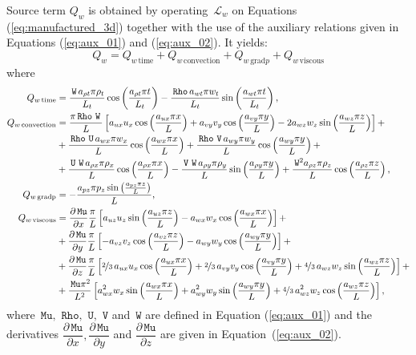\documentclass[10pt]{article}
\newcommand{\diff}[2] {\dfrac{\partial #1}{\partial #2}}
\newcommand{\Rho}{\,\mathtt{Rho}}
\newcommand{\U}{\,\mathtt{U}}
\newcommand{\V}{\,\mathtt{V}}
\newcommand{\W}{\,\mathtt{W}}
\newcommand{\Lo}{\,\mathcal{L}}
\newcommand{\Mu}{\,\mathtt{Mu}}
\newcommand{\DMuDx}{\diff{\Mu}{x}}
\newcommand{\DMuDy}{\diff{\Mu}{y}}
\newcommand{\DMuDz}{\diff{\Mu}{z}}
\newcommand{\convection}{\text{convection}}
\newcommand{\gradp}{\text{grad}p}
\newcommand{\viscous}{\text{viscous}}
\begin{document}
Source term $Q_w $ is obtained by operating $\Lo_{w }$ on Equations  (\ref{eq:manufactured_3d}) together with the use of the  auxiliary relations given in Equations (\ref{eq:aux_01}) and (\ref{eq:aux_02}). It yields:
\begin{equation*}
Q_w  = Q_{w  \, \text{time}}+Q_{w  \, \convection}+Q_{w  \, \gradp }+Q_{w  \, \viscous }
\end{equation*}
where
\begin{equation*}
 \begin{split}
 Q_{w \, \text{time}}&= 
\frac{\W \, a_{\rho t} \pi  \rho_{t} }{L_t}\cos\left(\frac{a_{\rho t} \pi t}{L_t}\right) - \frac{\Rho \, a_{wt} \pi w_{t} }{L_t}\sin\left(\frac{a_{wt} \pi t}{L_t}\right),\\
%
 Q_{w \, \text{convection}}&= 
\frac{\pi \Rho \, \W \, }{L}\left[a_{ux} u_{x} \cos\left(\frac{a_{ux} \pi x}{L}\right) + a_{vy} v_{y} \cos\left(\frac{a_{vy} \pi y}{L}\right) - 2 a_{wz} w_{z} \sin\left(\frac{a_{wz} \pi z}{L}\right)\right] + \\ 
&+ \frac{\Rho \, \U \, a_{wx} \pi w_{x} }{L} \cos\left(\frac{a_{wx} \pi x}{L}\right)+ \frac{\Rho \, \V \, a_{wy} \pi w_{y} }{L}\cos\left(\frac{a_{wy} \pi y}{L}\right) + \\ 
&+ \frac{\U \, \W \, a_{\rho x} \pi \rho_{x} }{L}\cos\left(\frac{a_{\rho x} \pi x}{L}\right) - \frac{\V \, \W \, a_{\rho y} \pi \rho_{y} }{L}\sin\left(\frac{a_{\rho y} \pi y}{L}\right)+ \frac{\W^{2} a_{\rho z} \pi \rho_{z} }{L}\cos\left(\frac{a_{\rho z} \pi z}{L}\right) ,\\
%
 Q_{w \, \text{gradp}}&= - \frac{a_{pz} \pi p_{z} \sin\left(\frac{a_{pz} \pi z}{L}\right)}{L},\\
%
 Q_{w \, \text{viscous}}&= 
\DMuDx\frac{\pi }{L} \left[a_{uz} u_{z} \sin\left(\frac{a_{uz} \pi z}{L}\right) - a_{wx} w_{x} \cos\left(\frac{a_{wx} \pi x}{L}\right)\right] + \\
&+ \DMuDy\frac{\pi }{L} \left[- a_{vz} v_{z} \cos\left(\frac{a_{vz} \pi z}{L}\right) - a_{wy} w_{y} \cos\left(\frac{a_{wy} \pi y}{L}\right)\right] + \\ 
&+ \DMuDz\frac{\pi }{L} \left[\nicefrac{2}{3} \, a_{ux} u_{x} \cos\left(\frac{a_{ux} \pi x}{L}\right) + \nicefrac{2}{3} \, a_{vy} v_{y} \cos\left(\frac{a_{vy} \pi y}{L}\right) + \nicefrac{4}{3} \, a_{wz} w_{z} \sin\left(\frac{a_{wz} \pi z}{L}\right)\right] + \\ 
&+ \frac{\Mu \pi^{2} }{L^2} \left[a_{wx}^{2} w_{x} \sin\left(\frac{a_{wx} \pi x}{L}\right) + a_{wy}^{2} w_{y} \sin\left(\frac{a_{wy} \pi y}{L}\right) + \nicefrac{4}{3} \, a_{wz}^{2} w_{z} \cos\left(\frac{a_{wz} \pi z}{L}\right)\right],
 \end{split}
\end{equation*}
where $\Mu,\, \Rho,\,\U,\,\V$ and $\W$ are defined in Equation (\ref{eq:aux_01}) and the derivatives $\DMuDx,\DMuDy$ and $\DMuDz$ are given in Equation~(\ref{eq:aux_02}).
\end{document}
